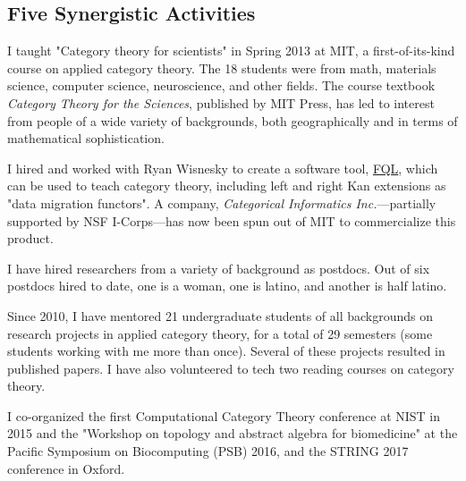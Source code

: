\documentclass[11pt,oneside,article]{memoir}
\theoremstyle{plain}
\theoremstyle{definition}
\theoremstyle{remark}
\begin{document}
\subsection{Five Synergistic Activities}
\begin{compactitem}
\item I taught "Category theory for scientists" in Spring 2013 at MIT, a first-of-its-kind course on applied category theory. The 18 students were from math, materials science, computer science, neuroscience, and other fields. The course textbook \emph{Category Theory for the Sciences}, published by MIT Press, has led to interest from people of a wide variety of backgrounds, both geographically and in terms of mathematical sophistication.
\item I hired and worked with Ryan Wisnesky to create a software tool, \href{http://categoricaldata.net/fql.html}{FQL}, which can be used to teach category theory, including left and right Kan extensions as "data migration functors". A company, \emph{Categorical Informatics Inc.}---partially supported by NSF I-Corps---has now been spun out of MIT to commercialize this product.
\item I have hired researchers from a variety of background as postdocs. Out of six postdocs hired to date, one is a woman, one is latino, and another is half latino. 
\item Since 2010, I have mentored 21 undergraduate students of all backgrounds on research projects in applied category theory, for a total of 29 semesters (some students working with me more than once). Several of these projects resulted in published papers. I have also volunteered to tech two reading courses on category theory.
\item I co-organized the first Computational Category Theory conference at NIST in 2015 and the "Workshop on topology and abstract algebra for biomedicine" at the Pacific Symposium on Biocomputing (PSB) 2016, and the STRING 2017 conference in Oxford.
\end{compactitem}
\end{document}
